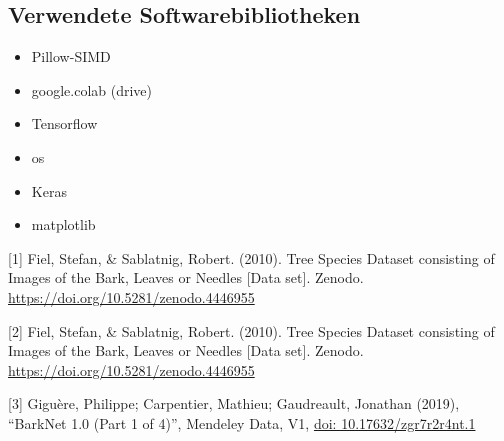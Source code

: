 \documentclass{article}
\begin{document}
\subsection*{Verwendete Softwarebibliotheken}
\begin{itemize}
\item Pillow-SIMD
\item google.colab (drive)
\item Tensorflow
\item os
\item Keras
\item matplotlib
\end{itemize}

\medskip
\small
[1] Fiel, Stefan, \& Sablatnig, Robert. (2010). Tree Species Dataset consisting of Images of the Bark, Leaves or Needles [Data set]. Zenodo. \url{https://doi.org/10.5281/zenodo.4446955}

[2] Fiel, Stefan, \& Sablatnig, Robert. (2010). Tree Species Dataset consisting of Images of the Bark, Leaves or Needles [Data set]. Zenodo. \url{https://doi.org/10.5281/zenodo.4446955}

[3] Giguère, Philippe; Carpentier, Mathieu; Gaudreault, Jonathan (2019), “BarkNet 1.0 (Part 1 of  4)”, Mendeley Data, V1, \url{doi: 10.17632/zgr7r2r4nt.1}



\end{document}

